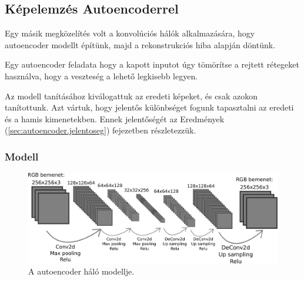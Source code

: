 %
%
%
%
%
%
%
%
%





\subsection{Képelemzés Autoencoderrel}
\label{sec:autoencoder}

Egy másik megközelítés volt a konvolúciós hálók alkalmazására, hogy autoencoder modellt 
építünk, majd a rekonstrukciós hiba alapján döntünk.

Egy autoencoder feladata hogy a kapott inputot úgy tömörítse a rejtett rétegeket
használva, hogy a veszteség a lehető legkisebb legyen.

Az modell tanításához kiválogattuk az eredeti képeket, és csak azokon tanítottunk.
Azt vártuk, hogy jelentős különbséget fogunk tapasztalni az eredeti és a hamis 
kimenetekben. Ennek jelentőségét az Eredmények (\ref{sec:autoencoder.jelentoseg}) fejezetben részletezzük. 


\subsubsection{Modell}




\begin{figure} [h!]
	\label{fig:autoencoder-halo-modell}
	\centering
	\includegraphics[scale=0.3]{img/autoencoder-network-modell.pdf}
	\caption{A autoencoder háló modellje.}
\end{figure}



